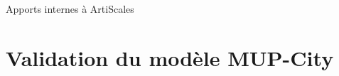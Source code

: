 \documentclass[xcolor=table]{beamer}
\begin{document}
\begin{frame}{Apports internes à ArtiScales}
\end{frame}


\section[Analyse de variabilité]{Validation du modèle MUP-City}
\end{document}
